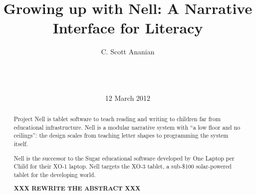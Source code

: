 \documentclass{acm_proc_article-sp}
\begin{document}
\title{Growing up with Nell: A Narrative Interface for Literacy}
%
%
%
%
%

\author{
%
%
\alignauthor
C. Scott Ananian\\
\\
\\
\\
}
\date{12 March 2012}

\maketitle

\begin{abstract}
Project Nell is tablet software to teach reading and writing to
children far from educational infrastructure.  Nell is a modular
narrative system with ``a low floor and no ceilings'': the design
scales from teaching letter shapes to programming the system itself.

Nell is the successor to the Sugar educational software developed by
One Laptop per Child for their XO-1 laptop.  Nell targets the XO-3
tablet, a sub-\$100 solar-powered tablet for the developing world.

\textbf{XXX REWRITE THE ABSTRACT XXX}
\end{abstract}
\end{document}
